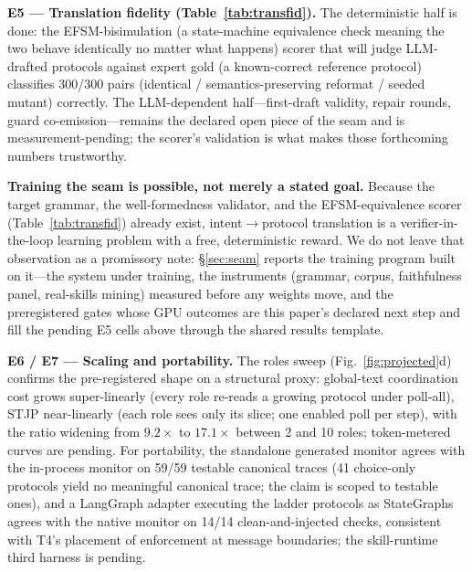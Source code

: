 \documentclass{article}
\newcommand{\stjp}{\textsc{STJP}}
\begin{document}
\textbf{E5 --- Translation fidelity (Table~\ref{tab:transfid}).} The deterministic half is done: the EFSM-bisimulation (a state-machine equivalence check meaning the two behave identically no matter what happens) scorer that will judge LLM-drafted protocols against expert gold (a known-correct reference protocol) classifies 300/300 pairs (identical / semantics-preserving reformat / seeded mutant) correctly. The LLM-dependent half---first-draft validity, repair rounds, guard co-emission---remains the declared open piece of the seam and is measurement-pending; the scorer's validation is what makes those forthcoming numbers trustworthy.

\textbf{Training the seam is possible, not merely a stated goal.} Because the target grammar, the well-formedness validator, and the EFSM-equivalence scorer (Table~\ref{tab:transfid}) already exist, intent$\to$protocol translation is a verifier-in-the-loop learning problem with a free, deterministic reward. We do not leave that observation as a promissory note: \S\ref{sec:seam} reports the training program built on it---the system under training, the instruments (grammar, corpus, faithfulness panel, real-skills mining) measured before any weights move, and the preregistered gates whose GPU outcomes are this paper's declared next step and fill the pending E5 cells above through the shared results template.

\textbf{E6 / E7 --- Scaling and portability.} The roles sweep (Fig.~\ref{fig:projected}d) confirms the pre-registered shape on a structural proxy: global-text coordination cost grows super-linearly (every role re-reads a growing protocol under poll-all), \stjp{} near-linearly (each role sees only its slice; one enabled poll per step), with the ratio widening from $9.2\times$ to $17.1\times$ between 2 and 10 roles; token-metered curves are pending. For portability, the standalone generated monitor agrees with the in-process monitor on 59/59 testable canonical traces (41 choice-only protocols yield no meaningful canonical trace; the claim is scoped to testable ones), and a LangGraph adapter executing the ladder protocols as StateGraphs agrees with the native monitor on 14/14 clean-and-injected checks, consistent with T4's placement of enforcement at message boundaries; the skill-runtime third harness is pending.
\end{document}
